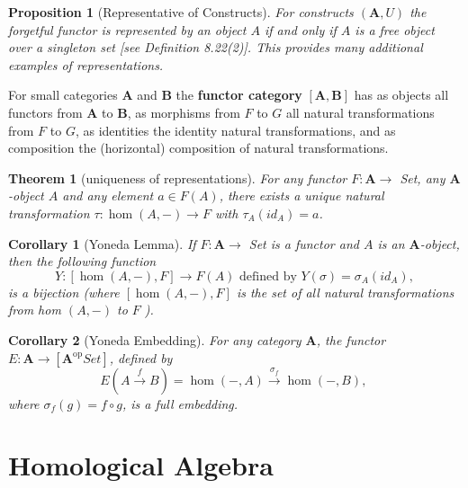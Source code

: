 \documentclass{book}
\newtheorem{theo}{Theorem}
\newtheorem{prop}{Proposition}
\newtheorem{coro}{Corollary}
\begin{document}
\begin{prop}[Representative of Constructs]
    For constructs $(\mathbf{A}, U)$ the forgetful functor is represented by an object $A$ if and only if $A$ is a free object over a singleton set [see Definition 8.22(2)]. This provides many additional examples of representations.
\end{prop}

For small categories $\mathbf{A}$ and $\mathbf{B}$ the \textbf{functor category} $[\mathbf{A}, \mathbf{B}]$ has as objects all functors from $\mathbf{A}$ to $\mathbf{B}$, as morphisms from $F$ to $G$ all natural transformations from $F$ to $G$, as identities the identity natural transformations, and as composition the (horizontal) composition of natural transformations.

\begin{theo}[uniqueness of representations]
    For any functor $F: \mathbf{A} \rightarrow$ Set, any $\mathbf{A}$-object $A$ and any element $a \in F(A)$, there exists a unique natural transformation $\tau: \operatorname{hom}(A,-) \rightarrow F$ with $\tau_A\left(i d_A\right)=a$.
\end{theo}

\begin{coro}[Yoneda Lemma]
    If $F: \mathbf{A} \rightarrow$ Set is a functor and $A$ is an $\mathbf{A}$-object, then the following function
    $$
    Y:[\operatorname{hom}(A,-), F] \rightarrow F(A) \text { defined by } Y(\sigma)=\sigma_A\left(i d_A\right),
    $$
    is a bijection (where $[\operatorname{hom}(A,-), F]$ is the set of all natural transformations from hom $(A,-)$ to $F$ ).
    
\end{coro}

\begin{coro}[Yoneda Embedding]
    For any category $\mathbf{A}$, the functor $E: \mathbf{A} \rightarrow\left[\mathbf{A}^{\mathrm{op}} Set \right]$, defined by
$$
E(A \xrightarrow{f} B)=\operatorname{hom}(-, A) \xrightarrow{\sigma_f} \operatorname{hom}(-, B) \text {, }
$$
where $\sigma_f(g)=f \circ g$, is a full embedding.
\end{coro}












\chapter{Homological Algebra}
\end{document}
